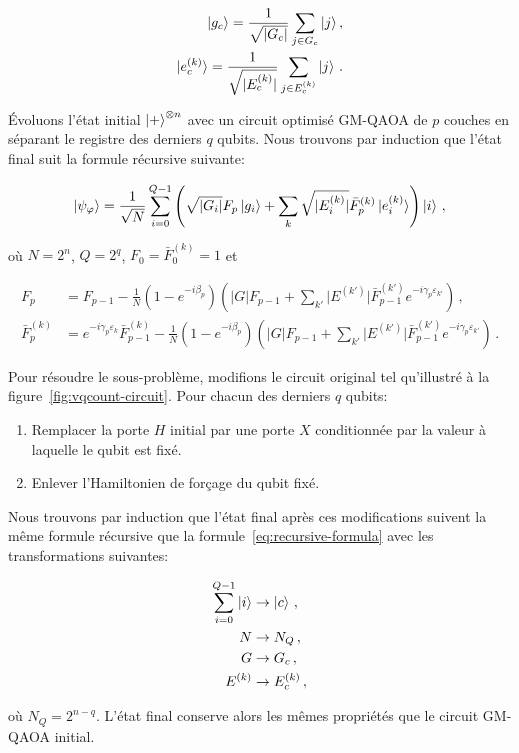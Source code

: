 \begin{align}
    \ket{g_{c}} = \frac{1}{\sqrt{ \lvert G_{c} \rvert }} \sum_{j \in G_{c}} \ket{j}, \\
    \ket{e^{(k)}_{c}} = \frac{1}{\sqrt{ \lvert E^{(k)}_{c} \rvert }} \sum_{j \in E^{(k)}_{c}} \ket{j} \,.
\end{align}

Évoluons l'état initial $\ket{+}^{\otimes n}$ avec un circuit optimisé GM-QAOA de $p$ couches en séparant le registre des derniers $q$ qubits. Nous trouvons par induction que l'état final suit la formule récursive suivante:

\begin{equation}
    \label{eq:recursive-formula}
    \ket{\psi_{\varphi}} = \frac{1}{\sqrt{ N }} \sum_{i=0}^{Q-1} \left( \sqrt{ \lvert G_{i} \rvert } F_{p} \ket{g_{i}} + \sum_{k} \sqrt{ \lvert E^{(k)}_{i} \rvert } \bar{F}^{(k)}_{p} \ket{e^{(k)}_{i}} \right) \ket{i} \,,
\end{equation}

où $N=2^{n}$, $Q=2^{q}$, $F_{0}=\bar{F}_{0}^{(k)}=1$ et

\begin{align}
    F_{p} &= F_{p-1} - \frac{1}{N} (1-e^{-i\beta_{p}}) \left( \lvert G \rvert   F_{p-1} + \sum_{k'} \lvert E^{(k')} \rvert \bar{F}^{(k')}_{p-1} e^{-i\gamma_{p}\varepsilon_{k'}} \right) \,, \\
    \bar{F}^{(k)}_{p} &= e^{-i\gamma_{p} \varepsilon_{k}}\bar{F}_{p-1}^{(k)} - \frac{1}{N} (1-e^{-i\beta_{p}}) \left( \lvert G \rvert   F_{p-1} + \sum_{k'} \lvert E^{(k')} \rvert \bar{F}^{(k')}_{p-1} e^{-i\gamma_{p}\varepsilon_{k'}} \right) \,.
\end{align}

Pour résoudre le sous-problème, modifions le circuit original tel qu'illustré à la figure~\ref{fig:vqcount-circuit}. Pour chacun des derniers $q$ qubits:

\begin{enumerate}
    \item Remplacer la porte $H$ initial par une porte $X$ conditionnée par la valeur à laquelle le qubit est fixé.
    \item Enlever l'Hamiltonien de forçage du qubit fixé.
\end{enumerate}

Nous trouvons par induction que l'état final après ces modifications suivent la même formule récursive que la formule~\ref{eq:recursive-formula} avec les transformations suivantes:

\begin{align*}
    \sum_{i=0}^{Q-1} \ket{i} &\to \ket{c} \,, \\
    N &\to N_{Q} \,, \\
    G &\to G_{c} \,, \\
    E^{(k)} &\to E^{(k)}_{c} \,,
\end{align*}

où $N_{Q} = 2^{n-q}$. L'état final conserve alors les mêmes propriétés que le circuit GM-QAOA initial.

